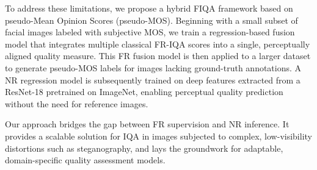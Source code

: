To address these limitations, we propose a hybrid FIQA framework based on pseudo-Mean Opinion Scores (pseudo-MOS). Beginning with a small subset of facial images labeled with subjective MOS, we train a regression-based fusion model that integrates multiple classical FR-IQA scores into a single, perceptually aligned quality measure. This FR fusion model is then applied to a larger dataset to generate pseudo-MOS labels for images lacking ground-truth annotations. A NR regression model is subsequently trained on deep features extracted from a ResNet-18 pretrained on ImageNet, enabling perceptual quality prediction without the need for reference images.

Our approach bridges the gap between FR supervision and NR inference. It provides a scalable solution for IQA in images subjected to complex, low-visibility distortions such as steganography, and lays the groundwork for adaptable, domain-specific quality assessment models.
